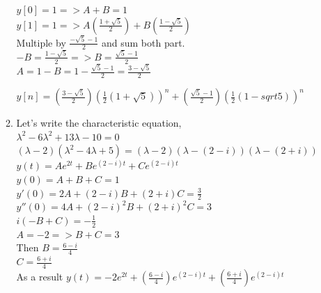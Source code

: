 \documentclass[10pt,a4paper, margin=1in]{article}
\begin{document}
\begin{enumerate}
\begin{enumerate}
    $y[0] = 1 => A + B = 1$ \\

    $y[1] = 1 => A(\frac{1+\sqrt{5}}{2}) + B(\frac{1-\sqrt{5}}{2})$ \\

    Multiple by $\frac{-\sqrt{5} - 1}{2}$ and sum both part. \\

    $-B = \frac{1-\sqrt{5}}{2} => B = \frac{\sqrt{5} - 1}{2}$ \\

    $A = 1 - B = 1 - \frac{\sqrt{5} - 1}{2} = \frac{3 - \sqrt{5}}{2}$

    $y[n] = (\frac{3 - \sqrt{5}}{2})(\frac{1}{2}(1+\sqrt{5}))^n + (\frac{\sqrt{5} - 1}{2}) (\frac{1}{2}(1-sqrt{5}))^n$\\
    \item %
    Let's write the characteristic equation, \\

    $\lambda^2-6\lambda^2+13\lambda-10 = 0$\\

    $(\lambda-2)(\lambda^2-4\lambda+5) = (\lambda-2)(\lambda - (2 - i))(\lambda - (2 + i))$ \\

    $y(t) = Ae^{2t}+Be^{(2-i)t}+Ce^{(2-i)t}$\\

    $y(0) = A + B + C = 1$ \\

    $y'(0) = 2A + (2-i)B + (2+i)C = \frac{3}{2}$\\

    $y''(0) = 4A + (2-i)^2B+(2+i)^2C = 3$ \\

    $i(-B+C) = -\frac{1}{2}$\\

    $A = -2 => B + C = 3$ \\

    Then $B = \frac{6 - i}{4}$ \\

    $C = \frac{6 + i}{4}$\\

    As a result $y(t) = -2e^{2t}+(\frac{6 - i}{4})e^{(2-i)t}+(\frac{6 + i}{4})e^{(2-i)t}$
    \end{enumerate}


\end{enumerate}
\end{document}
